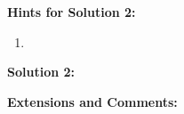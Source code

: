 \textbf{Hints for Solution 2:}

\begin{enumerate}
    \item 
\end{enumerate}

\textbf{Solution 2:}



\textbf{Extensions and Comments:}